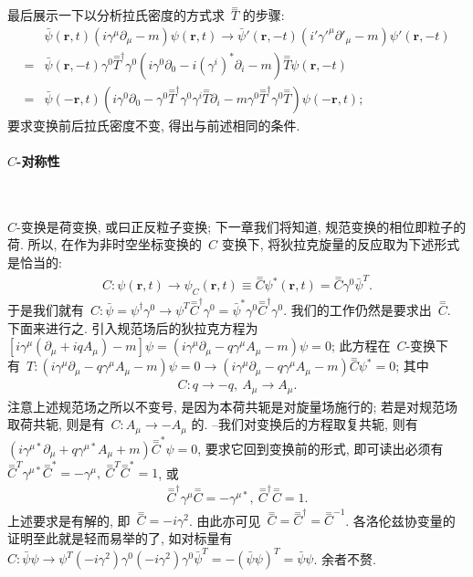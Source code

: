 最后展示一下以分析拉氏密度的方式求~$\overset{=}{T}$ 的步骤:
\begin{align}
&\bar{\psi}(\bm{r},t)(i\gamma^\mu\partial_\mu-m)\psi(\bm{r},t)\rightarrow\bar{\psi}'(\bm{r},-t)(i'\gamma'^\mu\partial'_\mu-m)\psi'(\bm{r},-t)\nonumber\\
=&\bar{\psi}(\bm{r},-t)\gamma^0\overset{=}{T}^\dag\gamma^0(i\gamma^0\partial_0-i(\gamma^i)^*\partial_i-m)\overset{=}{T}\psi(\bm{r},-t)\nonumber\\
=&\bar{\psi}(-\bm{r},t)(i\gamma^0\partial_0-\gamma^0\overset{=}{T}^\dag\gamma^0\gamma^i\overset{=}{T}\partial_i-m\gamma^0\overset{=}{T}^\dag\gamma^0\overset{=}{T})
\psi(-\bm{r},t);
\end{align}
要求变换前后拉氏密度不变, 得出与前述相同的条件.



\paragraph{$C$-对称性}
~

$C$-变换是荷变换, 或曰正反粒子变换; 下一章我们将知道, 规范变换的相位即粒子的荷. 所以, 在作为非时空坐标变换的~$C$ 变换下, 将狄拉克旋量的反应取为下述形式是恰当的:
\begin{align}
C: \psi(\bm{r},t)\rightarrow\psi_C(\bm{r},t)\equiv\overset{=}{C}\psi^*(\bm{r},t)=\overset{=}{C}\gamma^0\bar{\psi}^T.
\end{align}
于是我们就有~$C:\bar{\psi}=\psi^\dag\gamma^0\rightarrow\psi^T\overset{=}{C}^\dag\gamma^0=\bar{\psi}^*\gamma^0\overset{=}{C}^\dag\gamma^0$. 我们的工作仍然是要求出~$\overset{=}{C}$. 下面来进行之. 引入规范场后的狄拉克方程为~$[i\gamma^\mu(\partial_\mu+iqA_\mu)-m]\psi=(i\gamma^\mu\partial_\mu-q\gamma^\mu A_\mu-m)\psi=0$; 此方程在~$C$-变换下有~$T:(i\gamma^\mu\partial_\mu-q\gamma^\mu A_\mu-m)\psi=0\rightarrow(i\gamma^\mu\partial_\mu-q\gamma^\mu A_\mu-m)\overset{=}{C}\psi^*=0$; 其中\begin{align}
C:q\rightarrow-q,~A_\mu\rightarrow A_\mu.
\end{align}
注意上述规范场之所以不变号, 是因为本荷共轭是对旋量场施行的; 若是对规范场取荷共轭, 则是有~$C:A_\mu\rightarrow-A_\mu$ 的. --我们对变换后的方程取复共轭, 则有~$(i\gamma^{\mu*}\partial_\mu+q\gamma^{\mu*} A_\mu+m)\overset{=}{C}^*\psi=0$, 要求它回到变换前的形式, 即可读出必须有~$\overset{=}{C}^T\gamma^{\mu*}\overset{=}{C}^*=-\gamma^\mu,~\overset{=}{C}^T\overset{=}{C}^*=1$, 或
\begin{align}
\overset{=}{C}^\dag\gamma^{\mu}\overset{=}{C}=-\gamma^{\mu*},~\overset{=}{C}^\dag\overset{=}{C}=1.
\end{align}
上述要求是有解的, 即~$\overset{=}{C}=-i\gamma^2$. 由此亦可见~$\overset{=}{C}=\overset{=}{C}^\dag=\overset{=}{C}^{-1}$. 各洛伦兹协变量的证明至此就是轻而易举的了, 如对标量有~$C:\bar{\psi}\psi\rightarrow\psi^T(-i\gamma^2)\gamma^0(-i\gamma^2)\gamma^0\bar{\psi}^T=-(\bar{\psi}\psi)^T=\bar{\psi}\psi$. 余者不赘.

